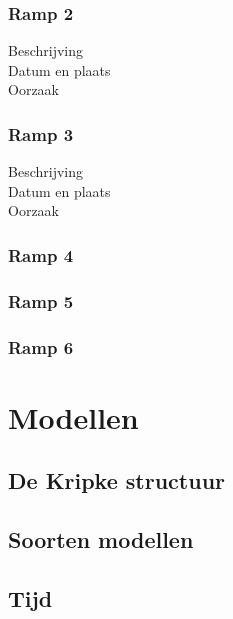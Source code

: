 \documentclass{article}
\begin{document}
	\subsubsection{Ramp 2}
	\begin{description}
		\item[Beschrijving]
		\item[Datum en plaats] 
		\item[Oorzaak]
	\end{description}
	
	\subsubsection{Ramp 3}
	\begin{description}
		\item[Beschrijving]
		\item[Datum en plaats] 
		\item[Oorzaak]
	\end{description}
	
	\subsubsection{Ramp 4}
	\subsubsection{Ramp 5}
	\subsubsection{Ramp 6}
	
	\section{Modellen}
	
	\subsection{De Kripke structuur}
	
	\subsection{Soorten modellen}
	
	\subsection{Tijd}
	
\end{document}
